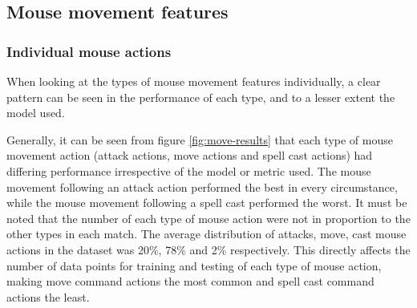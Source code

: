\documentclass[Report.tex]{subfiles}
\begin{document}
\subsection{Mouse movement features}\label{sec:mm-features-results}

\subsubsection{Individual mouse actions}
When looking at the types of mouse movement features individually, a clear pattern can be seen in the performance of each type, and to a lesser extent the model used.

Generally, it can be seen from figure \ref{fig:move-results} that each type of mouse movement action (attack actions, move actions and spell cast actions) had differing performance irrespective of the model or metric used. The mouse movement following an attack action performed the best in every circumstance, while the mouse movement following a spell cast performed the worst. It must be noted that the number of each type of mouse action were not in proportion to the other types in each match. The average distribution of attacks, move, cast mouse actions in the dataset was 20\%, 78\% and 2\% respectively. This directly affects the number of data points for training and testing of each type of mouse action, making move command actions the most common and spell cast command actions the least. 
\end{document}
